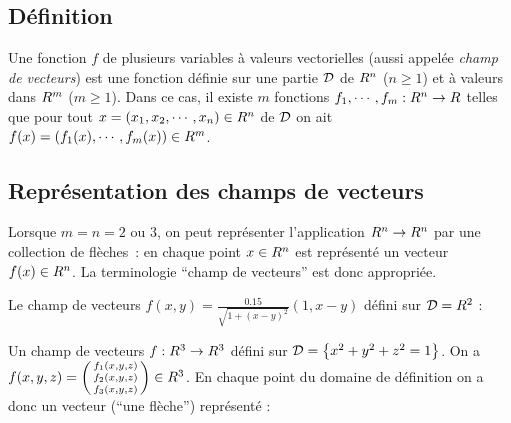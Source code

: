 \subsection{Définition}

\begin{definition}
    Une fonction $f$ de plusieurs variables à valeurs vectorielles (aussi appelée \emph{champ de vecteurs}) est une fonction définie sur une partie $\mathcal{D}$ de $R^n$ ($n\geq 1$) et à valeurs dans $R^m$ ($m\geq 1$). Dans ce cas, il existe $m$ fonctions $f_1,\cdots,f_m : R^n \to R$ telles que pour tout $x =(x_1,x_2,\cdots,x_n)\in R^n$ de $\mathcal{D}$ on ait $f(x) = (f_1(x),\cdots,f_m(x)) \in R^m$.
\end{definition}

\sld{\vfill\pagebreak[5]}%
\subsection{Représentation des champs de vecteurs}

Lorsque $m=n=2$ ou $3$, on peut représenter l'application $R^n \to R^n$ par une collection de flèches~: en chaque point $x\in R^n$ est représenté un vecteur $f(x)\in R^n$. La terminologie ``champ de vecteurs'' est donc appropriée.

\sld{\vfill\pagebreak[5]}%
\begin{exemple}
    Le champ de vecteurs $f(x,y) = \frac{0.15}{\sqrt{1+(x-y)^2}} \left(1, x-y\right )$ défini sur $\mathcal{D} = R^2$ :
    \begin{center}
        \tikzexternalenable
        
        \tikzexternaldisable
    \end{center}
\end{exemple}

\sld{\vfill\pagebreak[5]}%
\begin{exemple}
    Un champ de vecteurs $f:R^3 \to R^3$ défini sur $\mathcal{D} =\left\{ x^2 + y^2 + z^2 =1 \right\}$. On a $f(x,y,z) = \begin{psmallmatrix}f_1(x,y,z)\\ f_2(x,y,z) \\ f_3(x,y,z)\end{psmallmatrix} \in R^3$. En chaque point du domaine de définition on a donc un vecteur (``une flèche'') représenté :
    \begin{center}
        \tikzexternalenable
        
        \tikzexternaldisable

    \end{center}
\end{exemple}


